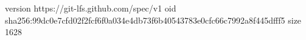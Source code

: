 version https://git-lfs.github.com/spec/v1
oid sha256:99dc0e7cfd02f2fcf6f0a034e4db73f6b40543783e0cfc66c7992a8f445dfff5
size 1628
